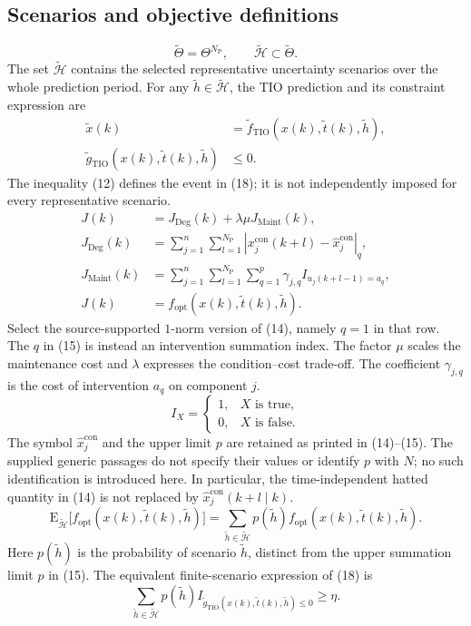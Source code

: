 \documentclass{article}
\begin{document}
\subsection*{Scenarios and objective definitions}
\[
\tilde\Theta=\Theta^{N_{\mathrm P}},\qquad
\tilde{\mathcal H}\subset\tilde\Theta.
\]
The set $\tilde{\mathcal H}$ contains the selected representative uncertainty scenarios over the whole prediction period. For any $\tilde h\in\tilde{\mathcal H}$, the TIO prediction and its constraint expression are
\begin{align}
\tilde x(k)&=\tilde f_{\mathrm{TIO}}(x(k),\tilde t(k),\tilde h), \tag{11}\\
\tilde g_{\mathrm{TIO}}(x(k),\tilde t(k),\tilde h)&\leq0. \tag{12}
\end{align}
The inequality (12) defines the event in (18); it is not independently imposed for every representative scenario.
\begin{align}
J(k)&=J_{\mathrm{Deg}}(k)+\lambda\mu J_{\mathrm{Maint}}(k), \tag{13}\\
J_{\mathrm{Deg}}(k)&=\sum_{j=1}^{n}\sum_{l=1}^{N_{\mathrm P}}
\left|x_j^{\mathrm{con}}(k+l)-\hat x_j^{\mathrm{con}}\right|_q, \tag{14}\\
J_{\mathrm{Maint}}(k)&=\sum_{j=1}^{n}\sum_{l=1}^{N_{\mathrm P}}\sum_{q=1}^{p}
\gamma_{j,q}I_{u_j(k+l-1)=a_q}, \tag{15}\\
J(k)&=f_{\mathrm{opt}}(x(k),\tilde t(k),\tilde h). \tag{16}
\end{align}
Select the source-supported $1$-norm version of (14), namely $q=1$ in that row. The $q$ in (15) is instead an intervention summation index. The factor $\mu$ scales the maintenance cost and $\lambda$ expresses the condition--cost trade-off. The coefficient $\gamma_{j,q}$ is the cost of intervention $a_q$ on component $j$.
\[
I_X=\begin{cases}1,&X\text{ is true},\\0,&X\text{ is false}.\end{cases}
\]
The symbol $\hat x_j^{\mathrm{con}}$ and the upper limit $p$ are retained as printed in (14)--(15). The supplied generic passages do not specify their values or identify $p$ with $N$; no such identification is introduced here. In particular, the time-independent hatted quantity in (14) is not replaced by $\hat x_j^{\mathrm{con}}(k+l\mid k)$.
\begin{equation}
\mathrm E_{\tilde{\mathcal H}}\bigl[f_{\mathrm{opt}}(x(k),\tilde t(k),\tilde h)\bigr]
=\sum_{\tilde h\in\tilde{\mathcal H}}p(\tilde h)
 f_{\mathrm{opt}}(x(k),\tilde t(k),\tilde h).\tag{20}
\end{equation}
Here $p(\tilde h)$ is the probability of scenario $\tilde h$, distinct from the upper summation limit $p$ in (15). The equivalent finite-scenario expression of (18) is
\begin{equation}
\sum_{\tilde h\in\tilde{\mathcal H}}p(\tilde h)
 I_{\tilde g_{\mathrm{TIO}}(x(k),\tilde t(k),\tilde h)\leq0}\geq\eta.\tag{21}
\end{equation}
\end{document}
